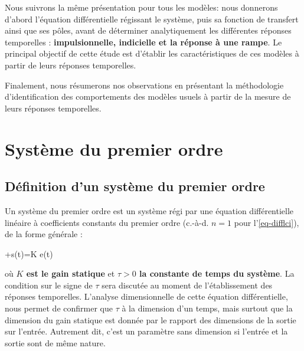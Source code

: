 Nous suivrons la même présentation pour tous les modèles: 
nous donnerons d'abord l'équation différentielle régissant le système, puis 
sa fonction de transfert ainsi que ses pôles, avant de 
déterminer analytiquement les différentes réponses temporelles : 
\textbf{impulsionnelle, indicielle et la réponse à une rampe}. 
Le principal objectif de cette étude est d'établir les caractéristiques 
de ces modèles à partir de leurs réponses temporelles.

Finalement, nous résumerons nos observations en présentant la méthodologie  
d'identification des comportements des modèles usuels à partir de la mesure
de leurs réponses temporelles.     
\section{Système du premier ordre}
\subsection{Définition d'un système du premier ordre}
Un système du premier ordre est un système régi par une équation
différentielle linéaire à coefficients constants du premier ordre 
(c.-à-d. $n=1$ pour l'\cref{eq-difflci}), de la forme générale :
\begin{bequation}
    \tau{}+s(t)=K e(t)\label{eq-1er}
\end{bequation}
où \textbf{$K$ est le gain statique} et \textbf{$\tau>0$ la constante de 
temps du système}. La condition sur le signe de $\tau$ sera 
discutée au moment de l'établissement des réponses temporelles.
L'analyse dimensionnelle de cette équation différentielle, nous permet 
de confirmer que $\tau$ à la dimension d'un temps, mais surtout que 
la dimension du gain statique est donnée par le rapport des dimensions de 
la sortie sur l'entrée. Autrement dit, c'est un paramètre sans dimension 
si l'entrée et la sortie sont de même nature.
\newpage

\captionsetup{width=0.9\linewidth}

